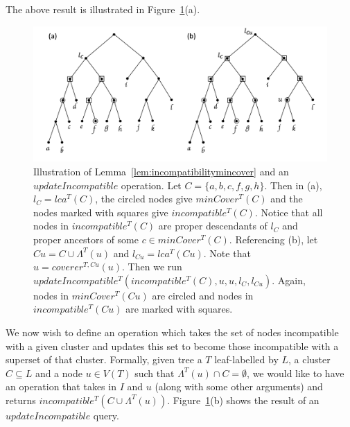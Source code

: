 \documentclass[12pt,a4paper]{article}
\newcommand{\leafset}{\Lambda}
\begin{document}
    The above result is illustrated in Figure~\ref{fig:incompatibility}(a).

    \begin{figure}[ht]
        \includegraphics[scale=0.5]{incompatibility}
        \centering
        \caption[Incompatibility and the $updateIncompatible$ operation]{Illustration of Lemma~\ref{lem:incompatibilitymincover} and an $updateIncompatible$ operation. Let $C = \{a, b, c, f, g, h\}$. Then in (a), $l_C = lca^T(C)$, the circled nodes give $minCover^{T}(C)$ and the nodes marked with squares give $incompatible^T(C)$. Notice that all nodes in $incompatible^T(C)$ are proper descendants of $l_C$ and proper ancestors of some $c \in minCover^{T}(C)$. Referencing (b), let $Cu = C \cup \leafset^{T}(u)$ and $l_{Cu} = lca^{T}(Cu)$. Note that $u = coverer^{T, Cu}(u)$. Then we run $updateIncompatible^{T}(incompatible^{T}(C), u, u, l_C, l_{Cu})$. Again, nodes in $minCover^{T}(Cu)$ are circled and nodes in $incompatible^{T}(Cu)$ are marked with squares.}
        \label{fig:incompatibility}
    \end{figure}

    We now wish to define an operation which takes the set of nodes incompatible with a given cluster and updates this set to become those incompatible with a superset of that cluster. Formally, given tree a $T$ leaf-labelled by $L$, a cluster $C \subseteq L$ and a node $u \in V(T)$ such that $\leafset^{T}(u) \cap C = \emptyset$, we would like to have an operation that takes in $I$ and $u$ (along with some other arguments) and returns $incompatible^{T}(C \cup \leafset^{T}(u))$. Figure~\ref{fig:incompatibility}(b) shows the result of an $updateIncompatible$ query.
\end{document}
